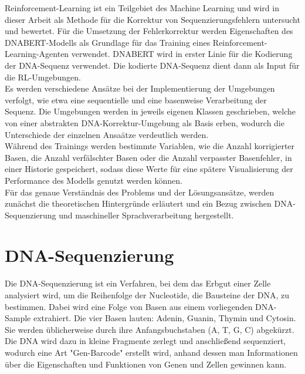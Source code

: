 \documentclass[oneside,bibliography=totocnumbered,BCOR=5mm]{scrbook}%
\theoremstyle{definition}
\theoremstyle{definition}
\theoremstyle{definition}
\theoremstyle{definition}
\theoremstyle{definition}
\theoremstyle{definition}
\begin{document}
Reinforcement-Learning ist ein Teilgebiet des Machine Learning und wird in dieser Arbeit als Methode für 
die Korrektur von Sequenzierungsfehlern untersucht und bewertet.
Für die Umsetzung der Fehlerkorrektur werden Eigenschaften des DNABERT-Modells als Grundlage für das Training eines
Reinforcement-Learning-Agenten verwendet. DNABERT wird in erster Linie für die Kodierung der
DNA-Sequenz verwendet. Die kodierte DNA-Sequenz dient dann als Input für die RL-Umgebungen. \\


Es werden verschiedene Ansätze bei der Implementierung der Umgebungen verfolgt, 
wie etwa eine sequentielle und eine basenweise Verarbeitung der Sequenz. 
Die Umgebungen werden in jeweils eigenen Klassen geschrieben, welche von einer abstrakten
DNA-Korrektur-Umgebung als Basis erben, wodurch die Unterschiede der einzelnen Ansaätze verdeutlich werden.  \\


Während des Trainings werden bestimmte Variablen, wie die Anzahl korrigierter Basen, die Anzahl
verfälschter Basen oder die Anzahl verpasster Basenfehler, in einer Historie gespeichert, 
sodass diese Werte für eine spätere Visualisierung der Performance des Modells genutzt werden können. \\


Für das genaue Verständnis des Problems und der Lösungsansätze, 
werden zunächst die theoretischen Hintergründe erläutert und ein Bezug zwischen DNA-Sequenzierung und maschineller Sprachverarbeitung hergestellt.

\section{DNA-Sequenzierung}


Die DNA-Sequenzierung ist ein Verfahren, bei dem das Erbgut einer Zelle analysiert wird, 
um die Reihenfolge der Nucleotide, die Bausteine der DNA, zu bestimmen. 
Dabei wird eine Folge von Basen aus einem vorliegenden DNA-Sample extrahiert.
Die vier Basen lauten: Adenin, Guanin, Thymin und Cytosin. 
Sie werden üblicherweise durch ihre Anfangsbuchstaben (A, T, G, C) abgekürzt. \\


Die DNA wird dazu in kleine Fragmente zerlegt und anschließend sequenziert, 
wodurch eine Art "Gen-Barcode" erstellt wird, anhand dessen man Informationen über die 
Eigenschaften und Funktionen von Genen und Zellen gewinnen kann. \\
\end{document}
